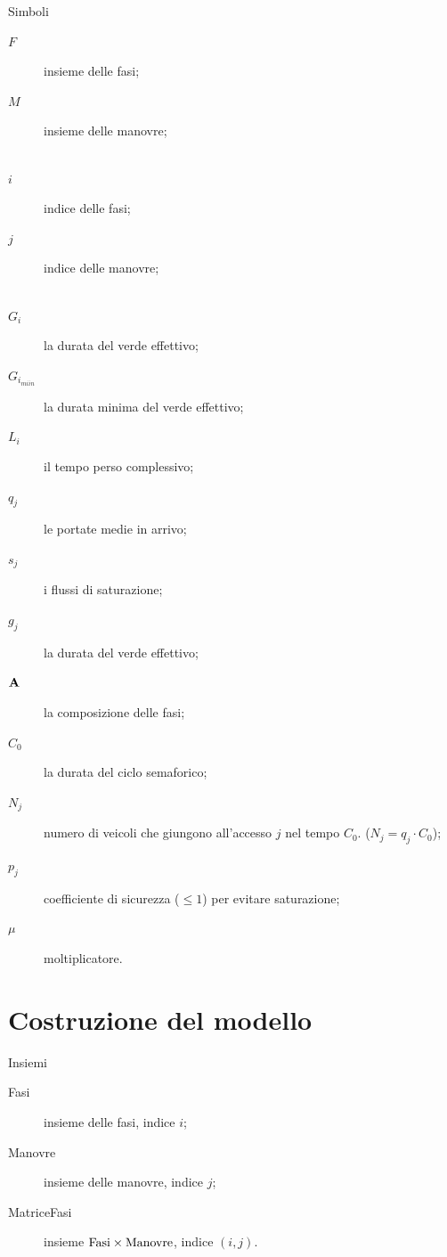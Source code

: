 \documentclass{beamer}
\begin{document}
\begin{frame}[allowframebreaks]{Simboli}
\begin{description}
	\item[$F$] insieme delle fasi;
	\item[$M$] insieme delle manovre;\\~
	\item[$i$] indice delle fasi;
	\item[$j$] indice delle manovre;\\~
	\item[$G_i$] la durata del verde effettivo;
	\item[$G_{i_{miin}}$] la durata minima del verde effettivo;
	\item[$L_i$] il tempo perso complessivo;
\end{description}
\framebreak
\begin{description}
  \item[$q_j$] le portate medie in arrivo;
  \item[$s_j$] i flussi di saturazione;
  \item[$g_j$] la durata del verde effettivo;
  \item[$\mathbf{A}$] la composizione delle fasi;
  \item[$C_0$] la durata del ciclo semaforico;
  \item[$N_j$] numero di veicoli che giungono all'accesso $j$ nel tempo $C_0$. ($N_j = q_j \cdot C_0$);
  \item[$p_j$] coefficiente di sicurezza ($\leq 1$) per evitare saturazione;
  \item[$\mu$] moltiplicatore.
  
\end{description}\end{frame}

\section{Costruzione del modello}

\begin{frame}{Insiemi}
  \begin{description}
	  \item[Fasi] insieme delle fasi, indice \alert{$i$};
	  \item[Manovre] insieme delle manovre, indice \alert{$j$};
	  \item[MatriceFasi] insieme $\rm Fasi \times \rm Manovre$, indice \alert{$(i, j)$}.
  \end{description}
\end{frame}
\end{document}
